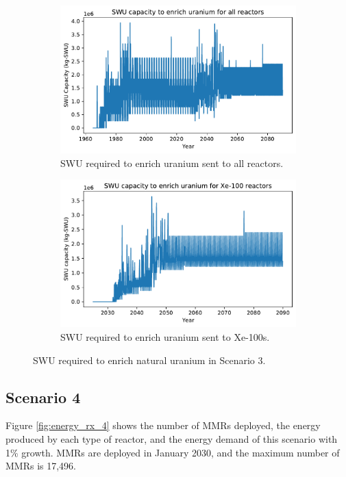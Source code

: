 \begin{figure}
    \centering
    \begin{subfigure}{0.45\textwidth}
        \centering
        \includegraphics[scale=0.4]{../figures/totalswu_scenarios_3.pdf}
        \caption{\gls{SWU} required to enrich uranium sent to all reactors.}
        \label{fig:totalswu_3}
    \end{subfigure}
    \hspace{0.8cm}
    \begin{subfigure}{0.45\textwidth}
        \centering
        \includegraphics[scale=0.4]{../figures/haleuSWU_scenarios_3.pdf}
        \caption{\gls{SWU} required to enrich uranium sent to Xe-100s.}
        \label{fig:haleuswu_3}
    \end{subfigure}
    \caption{\gls{SWU} required to enrich natural uranium in Scenario 3.}
    \label{fig:swu_3}
\end{figure}

\subsection{Scenario 4}
Figure \ref{fig:energy_rx_4} shows the number of \glspl{MMR} deployed, the
energy produced by each type of reactor, and the energy demand of this
scenario with 1\% growth. \glspl{MMR} are deployed in January 2030, and the maximum 
number of \glspl{MMR} is 17,496. 

